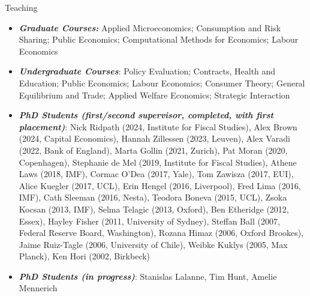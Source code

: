 \documentclass{resume} %
\begin{document}
\begin{rSection}{Teaching}
\begin{itemize}	
\item \textit{\textbf{Graduate Courses:}} Applied Microeconomics; Consumption and Risk Sharing; Public Economics; Computational Methods for Economics; Labour Economics
\item \textit{\textbf{Undergraduate Courses}}: Policy Evaluation; Contracts, Health and Education; Public Economics; Labour Economics; Consumer Theory; General Equilibrium and Trade; Applied Welfare Economics; Strategic Interaction

\item \textit{\textbf{PhD Students (first/second supervisor, completed, with first placement)}}: 
  Nick Ridpath (2024, Institute for Fiscal Studies), Alex Brown (2024, Capital Economics), Hannah Zillessen (2023, Leuven), Alex Varadi (2022, Bank of England), Marta Gollin (2021, Zurich), Pat Moran (2020, Copenhagen), Stephanie de Mel (2019, Institute for Fiscal Studies), Athene Laws (2018, IMF), Cormac O’Dea (2017, Yale),  Tom Zawisza (2017, EUI), Alice Kuegler (2017, UCL), Erin Hengel (2016, Liverpool), Fred Lima (2016, IMF), Cath Sleeman (2016, Nesta), Teodora Boneva (2015, UCL), Zsoka Kocsan (2013, IMF), Selma Telagic (2013, Oxford), Ben Etheridge (2012, Essex), Hayley Fisher (2011, University of Sydney), Steffan Ball (2007, Federal Reserve Board, Washington), Rozana Himaz (2006, Oxford Brookes), Jaime Ruiz-Tagle (2006, University of Chile), Weibke Kuklys (2005, Max Planck), Ken Hori (2002,  Birkbeck)
  \item \textit{\textbf{PhD Students (in progress)}}: Stanislas Lalanne, Tim Hunt, Amelie Mennerich
\end{itemize}
\end{rSection}

\newpage
\end{document}
